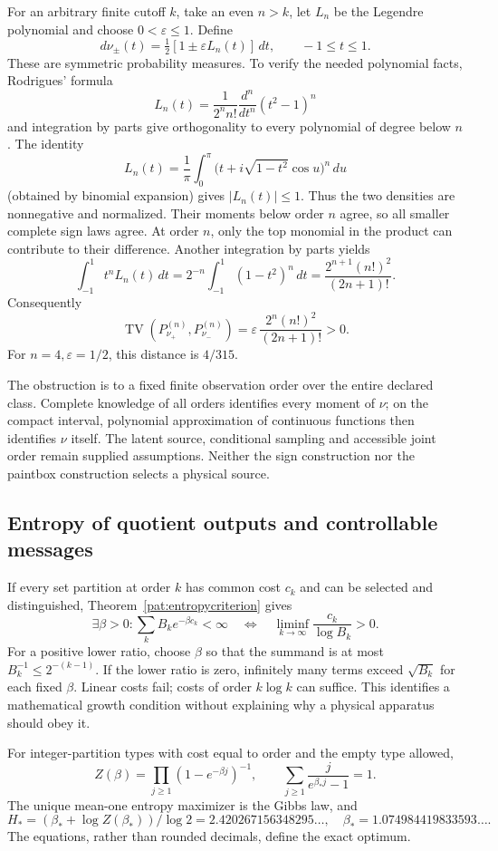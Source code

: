 For an arbitrary finite cutoff \(k\), take an even \(n>k\), let \(L_n\)
be the Legendre polynomial and choose \(0<\varepsilon\le1\).  Define
\[
 d\nu_\pm(t)=\tfrac12[1\pm\varepsilon L_n(t)]\,dt,
 \qquad -1\le t\le1.
\]
These are symmetric probability measures.  To verify the needed
polynomial facts, Rodrigues' formula
\[
 L_n(t)=\frac1{2^n n!}\frac{d^n}{dt^n}(t^2-1)^n
\]
and integration by parts give orthogonality to every polynomial of
degree below \(n\).  The identity
\[
 L_n(t)=\frac1\pi\int_0^\pi
       \bigl(t+i\sqrt{1-t^2}\cos u\bigr)^n\,du
\]
(obtained by binomial expansion) gives \(|L_n(t)|\le1\).
Thus the two densities are nonnegative and normalized.  Their
moments below order \(n\) agree, so all smaller complete sign laws agree.
At order \(n\), only the top monomial in the product can contribute
to their difference.  Another integration by parts yields
\[
 \int_{-1}^1t^nL_n(t)\,dt
 =2^{-n}\int_{-1}^1(1-t^2)^n\,dt
 =\frac{2^{n+1}(n!)^2}{(2n+1)!}.
\]
Consequently
\[
 \operatorname{TV}(P_{\nu_+}^{(n)},P_{\nu_-}^{(n)})
 =\varepsilon\,\frac{2^n(n!)^2}{(2n+1)!}>0 .
\]
For \(n=4,\varepsilon=1/2\), this distance is \(4/315\).

The obstruction is to a fixed finite observation order over the entire
declared class.  Complete knowledge of all orders identifies every
moment of \(\nu\); on the compact interval, polynomial approximation
of continuous functions then identifies \(\nu\) itself.
The latent source, conditional sampling and accessible joint order
remain supplied assumptions.  Neither the sign construction nor the
paintbox construction selects a physical source.

\subsection{Entropy of quotient outputs and controllable messages}
\label{pat:coherententropy}
If every set partition at order $k$ has common cost $c_k$ and can be selected and distinguished, Theorem~\ref{pat:entropycriterion} gives
\[
 \exists\beta>0:\sum_k B_ke^{-\beta c_k}<\infty
 \quad\Longleftrightarrow\quad
 \liminf_{k\to\infty}\frac{c_k}{\log B_k}>0.
\]
For a positive lower ratio, choose $\beta$ so that the summand is at most $B_k^{-1}\le2^{-(k-1)}$. If the lower ratio is zero, infinitely many terms exceed $\sqrt{B_k}$ for each fixed $\beta$. Linear costs fail; costs of order $k\log k$ can suffice. This identifies a mathematical growth condition without explaining why a physical apparatus should obey it.

For integer-partition types with cost equal to order and the empty type allowed,
\[
 Z(\beta)=\prod_{j\ge1}(1-e^{-\beta j})^{-1},\qquad
 \sum_{j\ge1}\frac{j}{e^{\beta_*j}-1}=1.
\]
The unique mean-one entropy maximizer is the Gibbs law, and
\[
 H_*=(\beta_*+\log Z(\beta_*))/\log2
 =2.420267156348295\ldots,\quad
 \beta_*=1.074984419833593\ldots.
\]
The equations, rather than rounded decimals, define the exact optimum.


